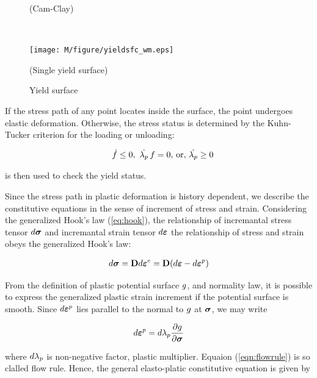 \begin{figure}[!htb]
\begin{center}
\begin{minipage}[t]{0.48\textwidth}
\begin{center}
    \centerline{(Cam-Clay)}
    \end{center}
   \end{minipage}\\
   \begin{minipage}[t]{0.48\textwidth}
     \begin{center}
    \texttt{[image: M/figure/yieldsfc\_wm.eps]}
    \centerline{(Single yield surface)}
    \end{center}
   \end{minipage}
  \end{center}
  \caption{Yield surface}
  \label{fig:yieldsfc}
\end{figure}

If the stress path of any point locates inside the surface, the point undergoes elastic deformation. Otherwise, the stress status is determined by the Kuhn-Tucker criterion for the loading or unloading:

\begin{eqnarray}
\label{kuhn_tucker}
\quad \dot{f} \leq 0, \,\, \dot{ \lambda_p}\,{f} = 0,\,\mbox{or},\,  \dot{ \lambda_p} \geq 0
\end{eqnarray}

is then used to check the yield status.

Since the stress path in plastic deformation is history dependent, we describe the constitutive equations in the sense of increment of stress and strain.
Considering the generalized Hook's law (\ref{eq:hook}),  the relationship of incremantal stress  tensor $d \bm \sigma$ and incremantal strain tensor $d \boldsymbol{\varepsilon}$ the relationship of
stress and strain obeys the generalized Hook's law:

\begin{eqnarray}
d\bm \sigma
= {\mathbf D} d\boldsymbol{\varepsilon}^e=
{\mathbf D} (d\boldsymbol{\varepsilon}-d\boldsymbol{\varepsilon}^p)
\label{eq:ghook}
\end{eqnarray}

From the definition of plastic potential surface $g$, and
normality law, it is possible to express the generalized plastic
strain increment if the potential surface is smooth. Since
$d\boldsymbol{\varepsilon}^p$ lies parallel to the normal to $g$ at $\bm \sigma$, we
may write

\begin{eqnarray}
d\boldsymbol{\varepsilon}^p =d \lambda_p \frac{\partial g}{\partial \bm \sigma}
\label{eqn:flowrule}
\end{eqnarray}

where $d \lambda_p$ is non-negative factor, plastic
multiplier. Equaion (\ref{eqn:flowrule}) is so clalled flow rule. Hence, the general elasto-platic constitutive equation is given by

